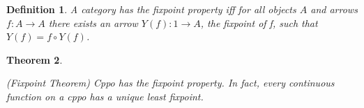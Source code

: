\documentclass[a4paper]{article}
\newcommand{\arr}{\rightarrow}
\newtheorem{definition}{Definition}[section]
\newtheorem{theorem}[definition]{Theorem}
\begin{document}
\begin{definition}

A category has the \emph{fixpoint property} iff for all objects $A$ and arrows
$f : A \arr A$ there exists an arrow $Y(f) : 1 \arr A$, the fixpoint of f, such
that $Y(f) = f \circ Y(f)$.

\begin{center}
\end{center}

\end{definition}


\begin{theorem} \label{thmFixpoint}

(Fixpoint Theorem) Cppo has the fixpoint property. In fact, every continuous
function on a cppo has a \emph{unique} least fixpoint.

\end{theorem}
\end{document}
